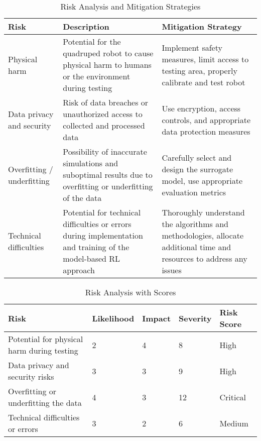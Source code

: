 \begin{table}[H]
    \centering
    \begin{tabular}{|p{2.5cm}|p{5cm}|p{5cm}|} \hline
    \textbf{Risk} & \textbf{Description} & \textbf{Mitigation Strategy} \\ \hline
    Physical harm & Potential for the quadruped robot to cause physical harm to humans or the environment during testing & Implement safety measures, limit access to testing area, properly calibrate and test robot \\ \hline
    Data privacy and security & Risk of data breaches or unauthorized access to collected and processed data & Use encryption, access controls, and appropriate data protection measures \\ \hline
    Overfitting / underfitting & Possibility of inaccurate simulations and suboptimal results due to overfitting or underfitting of the data & Carefully select and design the surrogate model, use appropriate evaluation metrics \\ \hline
    Technical difficulties & Potential for technical difficulties or errors during implementation and training of the model-based \ac{RL} approach & Thoroughly understand the algorithms and methodologies, allocate additional time and resources to address any issues \\ \hline
    \end{tabular}
    \caption{Risk Analysis and Mitigation Strategies}
    \label{tab:risk-analysis}
\end{table}

\begin{table}[H]
    \centering
    \begin{tabular}{|p{5cm}|p{2.5cm}|p{2.5cm}|p{2.5cm}|p{2.5cm}|} \hline
    \textbf{Risk} & \textbf{Likelihood} & \textbf{Impact} & \textbf{Severity} & \textbf{Risk Score} \\ \hline
    Potential for physical harm during testing & 2 & 4 & 8 & High \\ \hline
    Data privacy and security risks & 3 & 3 & 9 & High \\ \hline
    Overfitting or underfitting the data & 4 & 3 & 12 & Critical \\ \hline
    Technical difficulties or errors & 3 & 2 & 6 & Medium \\ \hline
    \end{tabular}
    \caption{Risk Analysis with Scores}
    \label{tab:risk-scores}
\end{table}